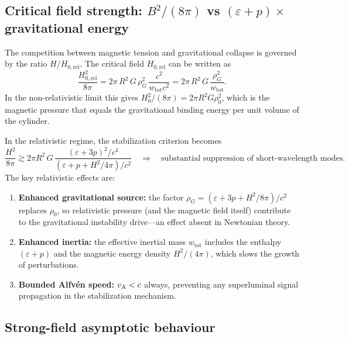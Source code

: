 \subsection{Critical field strength: $B^{2}/(8\pi)$ vs
$(\varepsilon+p)\times$gravitational energy}
\label{sec:rel-12-110-critical}

The competition between magnetic tension and gravitational collapse is
governed by the ratio $H/H_{0,\mathrm{rel}}$.  The critical field
$H_{0,\mathrm{rel}}$ can be written as
\begin{equation}
\label{eq:rel-12-110-20}
\frac{H_{0,\mathrm{rel}}^{2}}{8\pi}
= 2\pi\,R^{2}\,G\,\rho_{G}^{2}\,\frac{c^{2}}{w_{\mathrm{tot}}c^{2}}
= 2\pi\,R^{2}\,G\,\frac{\rho_{G}^{2}}{w_{\mathrm{tot}}}.
\end{equation}
In the non-relativistic limit this gives
$H_{0}^{2}/(8\pi) = 2\pi R^{2} G \rho_{0}^{2}$, which is the
magnetic pressure that equals the gravitational binding energy per
unit volume of the cylinder.

In the relativistic regime, the stabilization criterion becomes
\begin{equation}
\label{eq:rel-12-110-21}
\frac{H^{2}}{8\pi} \gtrsim 2\pi R^{2}\,G\,
\frac{(\varepsilon + 3p)^{2}/c^{4}}{(\varepsilon + p + H^{2}/4\pi)/c^{2}}
\quad\Longrightarrow\quad
\text{substantial suppression of short-wavelength modes.}
\end{equation}
The key relativistic effects are:
\begin{enumerate}
\item \textbf{Enhanced gravitational source:} the factor
  $\rho_{G} = (\varepsilon + 3p + H^{2}/8\pi)/c^{2}$ replaces
  $\rho_{0}$, so relativistic pressure (and the magnetic field itself)
  contribute to the gravitational instability drive---an effect absent
  in Newtonian theory.
\item \textbf{Enhanced inertia:}  the effective inertial mass
  $w_{\mathrm{tot}}$ includes the enthalpy $(\varepsilon+p)$ and the
  magnetic energy density $H^{2}/(4\pi)$, which slows the growth of
  perturbations.
\item \textbf{Bounded Alfv\'en speed:}  $v_{\mathrm{A}} < c$ always, preventing
  any superluminal signal propagation in the stabilization mechanism.
\end{enumerate}

\subsection{Strong-field asymptotic behaviour}
\label{sec:rel-12-110-strongB}


